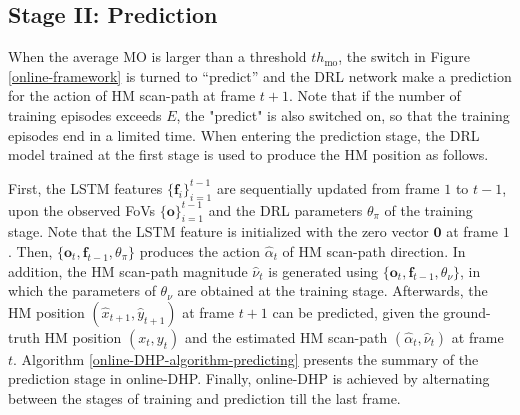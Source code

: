 \documentclass[10pt,journal,compsoc]{IEEEtran}
\begin{document}

\subsection{Stage II: Prediction}
When the average MO is larger than a threshold $th_{\text{mo}}$, the switch in Figure \ref{online-framework} is turned to ``predict'' and the DRL network make a prediction for the action of HM scan-path at frame $t+1$.
Note that if the number of training episodes exceeds $E$, the "predict" is also switched on, so that the training episodes end in a limited time.
When entering the prediction stage, the DRL model trained at the first stage is used to produce the HM position as follows.

First, the LSTM features $\{\mathbf{f}_i\}_{i=1}^{t-1}$ are sequentially updated from frame $1$ to $t-1$, upon the observed FoVs $\{\mathbf{o}\}_{i=1}^{t-1}$ and the DRL parameters $\theta_{\pi}$ of the training stage. Note that the LSTM feature is initialized with the zero vector $\mathbf{0}$ at frame $1$. Then, $\{\mathbf{o}_t, \mathbf{f}_{t-1}, \theta_{\pi}\}$ produces the action $\hat{\alpha}_t$ of HM scan-path direction. In addition, the HM scan-path magnitude $\hat{\nu}_t$ is generated using $\{\mathbf{o}_t, \mathbf{f}_{t-1}, \theta_{\nu}\}$, in which the parameters of $\theta_{\nu}$ are obtained at the training stage. Afterwards, the HM position $(\hat{x}_{t+1}, \hat{y}_{t+1})$ at frame $t+1$ can be predicted, given the ground-truth HM position $(\!x_{t}, \!y_{t}\!)$ and the estimated HM scan-path $(\hat{\alpha}_t, \hat{\nu}_t)$ at frame $t$. Algorithm \ref{online-DHP-algorithm-predicting} presents the summary of the prediction stage in online-DHP. Finally, online-DHP is achieved by alternating between the stages of training and prediction till the last frame.
\end{document}
